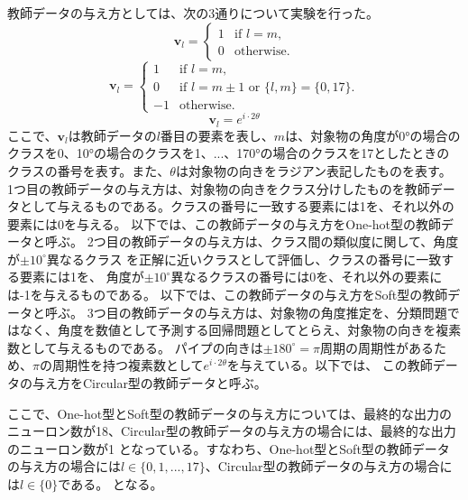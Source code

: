 \documentclass[11pt,a4paper,uplatex]{ujarticle}
\begin{document}
  教師データの与え方としては、次の3通りについて実験を行った。
  \begin{equation}\label{eq:onehot}
    \mathbf{v}_l =
    \begin{cases}
        1 & \text{if } l = m, \\
        0 & \text{otherwise}.
    \end{cases}
  \end{equation}
  \begin{equation}\label{eq:soft}
    \mathbf{v}_l =
    \begin{cases}
        1 & \text{if } l = m, \\
        0 & \text{if } l = m \pm 1 \text{ or } \{l, m\} = \{0, 17\}.\\
        -1 & \text{otherwise}.
    \end{cases}
  \end{equation}
  \begin{equation}\label{eq:circular}
    \mathbf{v}_l = e^{i\cdot2\theta}
  \end{equation}
  ここで、$\mathbf{v}_l$は教師データの$l$番目の要素を表し、$m$は、対象物の角度が0°の場合のクラスを0、10°の場合のクラスを1、...、170°の場合のクラスを17としたときの
  クラスの番号を表す。また、$\theta$は対象物の向きをラジアン表記したものを表す。
  1つ目の教師データの与え方は、対象物の向きをクラス分けしたものを教師データとして与えるものである。クラスの番号に一致する要素には1を、それ以外の要素には0を与える。
  以下では、この教師データの与え方をOne-hot型の教師データと呼ぶ。
  2つ目の教師データの与え方は、クラス間の類似度に関して、角度が$\pm10^{\circ}$異なるクラス
  を正解に近いクラスとして評価し、クラスの番号に一致する要素には1を、 角度が$\pm10^{\circ}$異なるクラスの番号には0を、それ以外の要素には-1を与えるものである。
  以下では、この教師データの与え方をSoft型の教師データと呼ぶ。
  3つ目の教師データの与え方は、対象物の角度推定を、分類問題ではなく、角度を数値として予測する回帰問題としてとらえ、対象物の向きを複素数として与えるものである。
  パイプの向きは$\pm180^{\circ} = \pi$周期の周期性があるため、$\pi$の周期性を持つ複素数として$e^{i\cdot2\theta}$を与えている。以下では、
  この教師データの与え方をCircular型の教師データと呼ぶ。

  ここで、One-hot型とSoft型の教師データの与え方については、最終的な出力のニューロン数が18、Circular型の教師データの与え方の場合には、最終的な出力のニューロン数が1
  となっている。すなわち、One-hot型とSoft型の教師データの与え方の場合には$l \in \{0,1,...,17\}$、Circular型の教師データの与え方の場合には$l \in \{0\}$である。
  となる。
\end{document}
